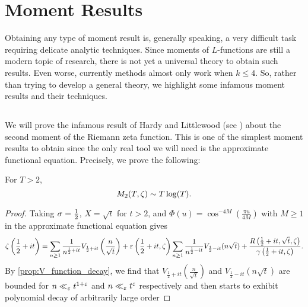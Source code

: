 \chapter{Moment Results}
  Obtaining any type of moment result is, generally speaking, a very difficult task requiring delicate analytic techniques. Since moments of $L$-functions are still a modern topic of research, there is not yet a universal theory to obtain such results. Even worse, currently methods almost only work when $k \le 4$. So, rather than trying to develop a general theory, we highlight some infamous moment results and their techniques.
  \section{}
    We will prove the infamous result of Hardy and Littlewood (see \cite{hardy1916contributions}) about the second moment of the Riemann zeta function. This is one of the simplest moment results to obtain since the only real tool we will need is the approximate functional equation. Precisely, we prove the following:

    \begin{theorem}
      For $T > 2$,
      \[
        M_{2}(T,\zeta) \sim T\log(T).
      \]
    \end{theorem}
    \begin{proof}
      Taking $\sigma = \frac{1}{2}$, $X = \sqrt{t}$ for $t > 2$, and $\Phi(u) = \cos^{-4M}\left(\frac{\pi u}{4M}\right)$ with $M \ge 1$ in the approximate functional equation gives
      \[
        \zeta\left(\frac{1}{2}+it\right) = \sum_{n \ge 1}\frac{1}{n^{\frac{1}{2}+it}}V_{\frac{1}{2}+it}\left(\frac{n}{\sqrt{t}}\right)+\varepsilon\left(\frac{1}{2}+it,\zeta\right)\sum_{n \ge 1}\frac{1}{n^{\frac{1}{2}-it}}V_{\frac{1}{2}-it}(n\sqrt{t})+\frac{R\left(\frac{1}{2}+it,\sqrt{t},\zeta\right)}{\gamma\left(\frac{1}{2}+it,\zeta\right)}.
      \]
      By \cref{prop:V_function_decay}, we find that $V_{\frac{1}{2}+it}\left(\frac{n}{\sqrt{t}}\right)$ and $V_{\frac{1}{2}-it}(n\sqrt{t})$ are bounded for $n \ll_{\varepsilon} t^{1+\varepsilon}$ and $n \ll_{\varepsilon} t^{\varepsilon}$ respectively and then starts to exhibit polynomial decay of arbitrarily large order 
    \end{proof}